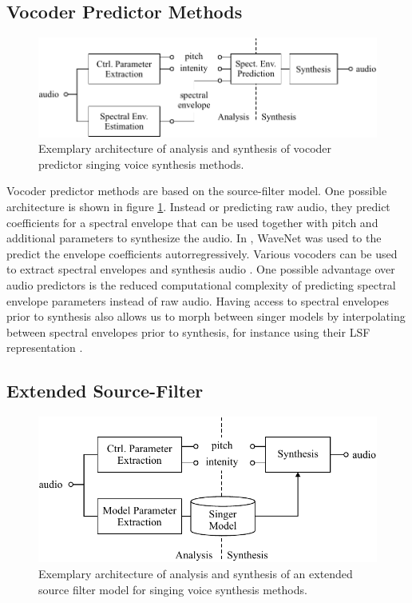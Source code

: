 \subsection{Vocoder Predictor Methods}

\begin{figure}[H]
    \centering
    \includegraphics{Graphics/008_method_vocoder_predictor.pdf}
    \caption{Exemplary architecture of analysis and synthesis of vocoder predictor singing voice synthesis methods. }
    \label{fig:method_vocoder}
\end{figure}

Vocoder predictor methods are based on the source-filter model. One possible architecture is shown in figure \ref{fig:method_vocoder}. Instead or predicting raw audio, they predict coefficients for a spectral envelope that can be used together with pitch and additional parameters to synthesize the audio. In  \cite{blaauw_neural_2017-1}, WaveNet was used to the predict the envelope coefficients autorregressively. Various vocoders can be used to extract spectral envelopes and synthesis audio \cite{morise_world:_2016}. One possible advantage over audio predictors is the reduced computational complexity of predicting spectral envelope parameters \cite{engel_ddsp:_2020} instead of raw audio. Having access to spectral envelopes prior to synthesis also allows us to morph between singer models by interpolating between spectral envelopes prior to synthesis, for instance using their LSF representation \cite{roddy_method_2014}. 

\subsection{Extended Source-Filter}
    
\begin{figure}[H]
    \centering
    \includegraphics{Graphics/009_method_extended_source_filter.pdf}
    \caption{Exemplary architecture of analysis and synthesis of an extended source filter model for singing voice synthesis methods. }
    \label{fig:method_esf}
\end{figure}

